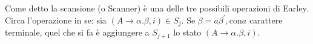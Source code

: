 \documentclass{subfiles}
\begin{document}
Come detto la scansione (o Scanner) è una delle tre possibili operazioni di Earley.
Circa l'operazione in se: sia $(A \to \alpha . \beta , i) \in S_{j}$. Se $\beta = a\beta^{'}, \text{con} a$ carattere terminale,
quel che si fa è aggiungere a $S_{j + 1}$ lo stato $(A \to \alpha . \beta , i)$.
\end{document}
